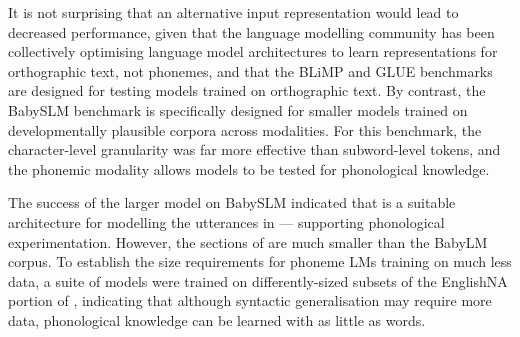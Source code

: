 It is not surprising that an alternative input representation would lead to decreased performance, given that the language modelling community has been collectively optimising language model architectures to learn representations for orthographic text, not phonemes, and that the BLiMP and GLUE benchmarks are designed for testing models trained on orthographic text. By contrast, the BabySLM benchmark is specifically designed for smaller models trained on developmentally plausible corpora across modalities. For this benchmark, the character-level granularity was far more effective than subword-level tokens, and the phonemic modality allows models to be tested for phonological knowledge.

The success of the larger \gpt model on BabySLM indicated that \gpt is a suitable architecture for modelling the utterances in \ipachildes --- supporting phonological experimentation. However, the sections of \ipachildes are much smaller than the BabyLM corpus. To establish the size requirements for phoneme LMs training on much less data, a suite of models were trained on differently-sized subsets of the EnglishNA portion of \ipachildes, indicating that although syntactic generalisation may require more data, phonological knowledge can be learned with as little as  words. 




